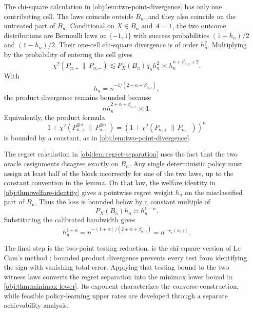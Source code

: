 The chi-square calculation in \cref{obj:lem:two-point-divergence} has only one contributing cell.  The laws coincide outside \(B_n\), and they also coincide on the untreated part of \(B_n\).  Conditional on \(X\in B_n\) and \(A=1\), the two outcome distributions are Bernoulli laws on \(\{-1,1\}\) with success probabilities \((1+h_n)/2\) and \((1-h_n)/2\).  Their one-cell chi-square divergence is of order \(h_n^2\).  Multiplying by the probability of entering the cell gives
\[
\chi^2(P_{n,+}\,\|\,P_{n,-})
\lesssim
P_X(B_n)q_nh_n^2
\asymp
h_n^{\alpha+\beta_{\alpha,\gamma}+2}.
\]
With
\[
h_n=n^{-1/(2+\alpha+\beta_{\alpha,\gamma})},
\]
the product divergence remains bounded because
\[
n h_n^{2+\alpha+\beta_{\alpha,\gamma}}\asymp 1.
\]
Equivalently, the product formula
\[
1+\chi^2(P_{n,+}^{\otimes n}\,\|\,P_{n,-}^{\otimes n})
=
\left(1+\chi^2(P_{n,+}\,\|\,P_{n,-})\right)^n
\]
is bounded by a constant, as in \cref{obj:lem:two-point-divergence}.

The regret calculation in \cref{obj:lem:regret-separation} uses the fact that the two oracle assignments disagree exactly on \(B_n\).  Any single deterministic policy must assign at least half of the block incorrectly for one of the two laws, up to the constant convention in the lemma.  On that law, the welfare identity in \cref{obj:thm:welfare-identity} gives a pointwise regret weight \(h_n\) on the misclassified part of \(B_n\).  Thus the loss is bounded below by a constant multiple of
\[
P_X(B_n)h_n
\asymp
h_n^{1+\alpha}.
\]
Substituting the calibrated bandwidth gives
\[
h_n^{1+\alpha}
=
n^{-(1+\alpha)/(2+\alpha+\beta_{\alpha,\gamma})}
=
n^{-r_\star(\alpha,\gamma)}.
\]

The final step is the two-point testing reduction.   is the chi-square version of Le Cam's method \citep{LeCam1986,Tsybakov2009}: bounded product divergence prevents every test from identifying the sign with vanishing total error.  Applying that testing bound to the two witness laws converts the regret separation into the minimax lower bound in \cref{obj:thm:minimax-lower}.  Its exponent characterizes the converse construction, while feasible policy-learning upper rates are developed through a separate achievability analysis.
